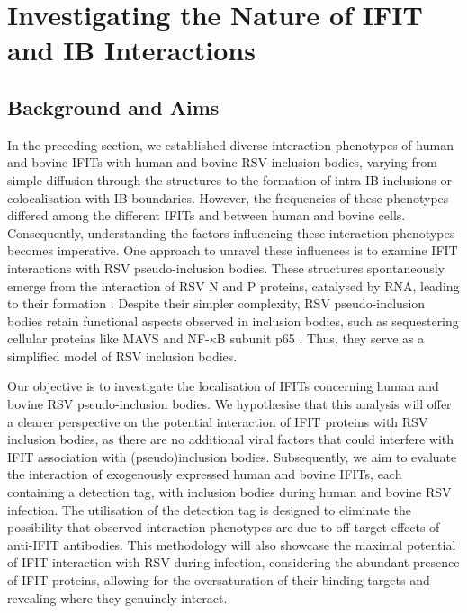 \chapter{Investigating the Nature of IFIT and IB Interactions} \label{ch:Investigating the Nature of IFIT and IB Interactions}
\section{Background and Aims} \label{sec:Background and Aims-Chapter4}
In the preceding section, we established diverse interaction phenotypes of human and bovine IFITs with human and bovine RSV inclusion bodies, varying from simple diffusion through the structures to the formation of intra-IB inclusions or colocalisation with IB boundaries. However, the frequencies of these phenotypes differed among the different IFITs and between human and bovine cells. Consequently, understanding the factors influencing these interaction phenotypes becomes imperative. One approach to unravel these influences is to examine IFIT interactions with RSV pseudo-inclusion bodies. These structures spontaneously emerge from the interaction of RSV N and P proteins, catalysed by RNA, leading to their formation \cite{Rincheval2017FunctionalVirus, Galloux2020MinimalVitro}. Despite their simpler complexity, RSV pseudo-inclusion bodies retain functional aspects observed in inclusion bodies, such as sequestering cellular proteins like MAVS and NF-\(\kappa\)B subunit p65 \cite{Rincheval2017FunctionalVirus, Jobe2023ViralCondensates}. Thus, they serve as a simplified model of RSV inclusion bodies.

Our objective is to investigate the localisation of IFITs concerning human and bovine RSV pseudo-inclusion bodies. We hypothesise that this analysis will offer a clearer perspective on the potential interaction of IFIT proteins with RSV inclusion bodies, as there are no additional viral factors that could interfere with IFIT association with (pseudo)inclusion bodies. Subsequently, we aim to evaluate the interaction of exogenously expressed human and bovine IFITs, each containing a detection tag, with inclusion bodies during human and bovine RSV infection. The utilisation of the detection tag is designed to eliminate the possibility that observed interaction phenotypes are due to off-target effects of anti-IFIT antibodies. This methodology will also showcase the maximal potential of IFIT interaction with RSV during infection, considering the abundant presence of IFIT proteins, allowing for the oversaturation of their binding targets and revealing where they genuinely interact.


